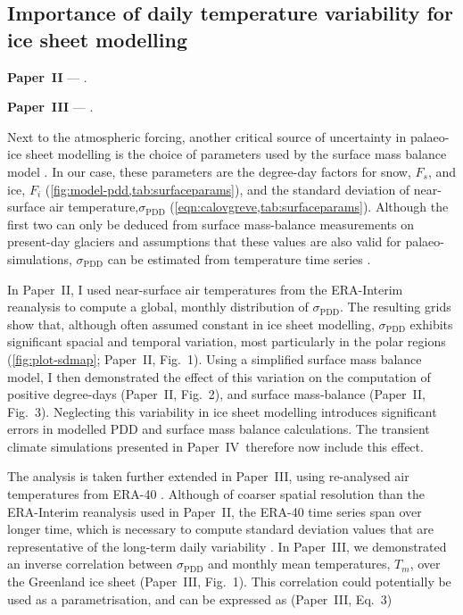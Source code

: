 \documentclass{article}
\newcommand{\sPDD}[0]{\sigma_{\mathrm{PDD}}}
\newcommand{\PSDV}[0]{Paper~II}     %
\newcommand{\PSDP}[0]{Paper~III}    %
\newcommand{\CCYC}[0]{Paper~IV}     %
\begin{document}
\subsection{Importance of daily temperature variability for ice sheet modelling}

\noindent\textbf{\PSDV} --- .
\bigskip

\noindent\textbf{\PSDP} --- .
\bigskip

Next to the atmospheric forcing, another critical source of uncertainty in
palaeo-ice sheet modelling is the choice of parameters used by the surface mass
balance model \citep[e.g.,][]{Hebeler.etal.2008}. In our case, these parameters
are the degree-day factors for snow, $F_s$, and ice, $F_i$
(\cref{fig:model-pdd,tab:surfaceparams}), and the standard deviation of
near-surface air temperature,$\sPDD$
(\cref{eqn:calovgreve,tab:surfaceparams}). Although the first two can only be
deduced from surface mass-balance measurements on present-day glaciers
\citep[e.g.,][]{Shea.etal.2009} and assumptions that these values are also
valid for palaeo-simulations, $\sPDD$ can be estimated from temperature time
series \citep[e.g.,][]{Fausto.etal.2011}.

In \PSDV, I used near-surface air temperatures from the ERA-Interim reanalysis
\citep{Dee.etal.2011} to compute a global, monthly distribution of $\sPDD$. The
resulting grids show that, although often assumed constant in ice sheet
modelling, $\sPDD$ exhibits significant spacial and temporal variation, most
particularly in the polar regions (\cref{fig:plot-sdmap}; \PSDV, Fig.~1). Using
a simplified surface mass balance model, I then demonstrated the effect of this
variation on the computation of positive degree-days (\PSDV, Fig.~2), and
surface mass-balance (\PSDV, Fig.~3). Neglecting this variability in ice sheet
modelling introduces significant errors in modelled PDD and surface mass
balance calculations. The transient climate simulations presented in \CCYC\
therefore now include this effect.

The analysis is taken further extended in \PSDP, using re-analysed air
temperatures from ERA-40 \citep{Uppala.etal.2005}. Although of coarser spatial
resolution than the ERA-Interim reanalysis used in \PSDV, the ERA-40 time
series span over longer time, which is necessary to compute standard deviation
values that are representative of the long-term daily variability
\citep{Rogozhina.Rau.2014}. In \PSDP, we demonstrated an inverse correlation
between $\sPDD$ and monthly mean temperatures, $T_m$, over the Greenland ice
sheet (\PSDP, Fig.~1). This correlation could potentially be used as a
parametrisation, and can be expressed as (\PSDP, Eq.~3)
\end{document}
